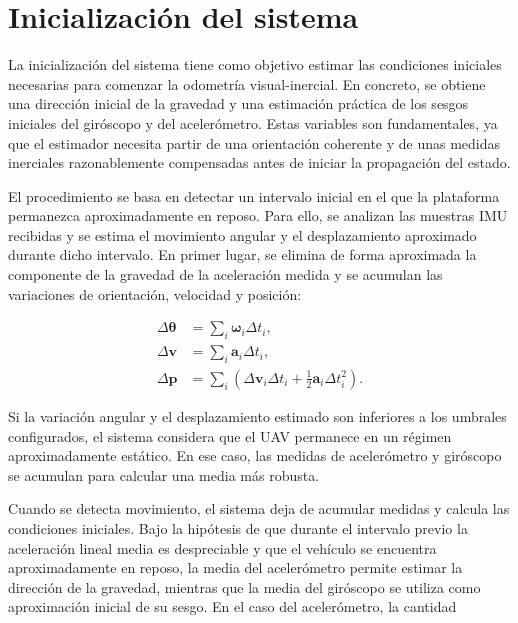 \section{Inicialización del sistema}

La inicialización del sistema tiene como objetivo estimar las condiciones iniciales necesarias para comenzar la odometría 
visual-inercial. En concreto, se obtiene una dirección inicial de la gravedad y una estimación práctica de los sesgos iniciales 
del giróscopo y del acelerómetro. Estas variables son fundamentales, ya que el estimador necesita partir de una orientación 
coherente y de unas medidas inerciales razonablemente compensadas antes de iniciar la propagación del estado.

El procedimiento se basa en detectar un intervalo inicial en el que la plataforma permanezca aproximadamente en reposo. Para ello, 
se analizan las muestras IMU recibidas y se estima el movimiento angular y el desplazamiento aproximado durante dicho intervalo. En 
primer lugar, se elimina de forma aproximada la componente de la gravedad de la aceleración medida y se acumulan las variaciones de 
orientación, velocidad y posición:

\begin{equation}
\begin{aligned}
    \Delta \boldsymbol{\theta}
    &=
    \sum_i
    \boldsymbol{\omega}_i \Delta t_i,
    \\
    \Delta \mathbf{v}
    &=
    \sum_i
    \mathbf{a}_i \Delta t_i,
    \\
    \Delta \mathbf{p}
    &=
    \sum_i
    \left(
        \Delta \mathbf{v}_i \Delta t_i
        +
        \frac{1}{2}
        \mathbf{a}_i \Delta t_i^2
    \right).
\end{aligned}
\end{equation}

Si la variación angular y el desplazamiento estimado son inferiores a los umbrales configurados, el sistema considera que el 
UAV permanece en un régimen aproximadamente estático. En ese caso, las medidas de acelerómetro y giróscopo se acumulan para 
calcular una media más robusta.

Cuando se detecta movimiento, el sistema deja de acumular medidas y calcula las condiciones iniciales. Bajo la hipótesis de que 
durante el intervalo previo la aceleración lineal media es despreciable y que el vehículo se encuentra aproximadamente en reposo, 
la media del acelerómetro permite estimar la dirección de la gravedad, mientras que la media del giróscopo se utiliza como 
aproximación inicial de su sesgo. En el caso del acelerómetro, la cantidad

